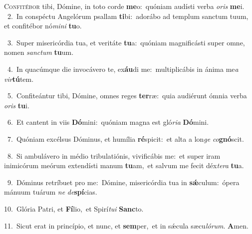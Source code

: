 \lettrine{\initial\textcolor{\initialcolor}{C}}{onfitébor} tibi, Dómine, in toto corde \textbf{me}\-o:~\star quóniam audísti verba \textit{o}\-\textit{ris} \textbf{me}\-i.\\
{\numbfont\textcolor{\numbcolor}{~2.}}~In conspéctu Angelórum psallam \textbf{ti}\-bi:~\star adorábo ad templum sanctum tuum, et confitébor nó\-\textit{mi}\-\textit{ni} \textbf{tu}\-o.\par
{\numbfont\textcolor{\numbcolor}{~3.}}~Super misericórdia tua, et veritáte \textbf{tu}\-a:~\star quóniam magnificásti super omne, nomen \textit{sanc}\-\textit{tum} \textbf{tu}\-um.\par
{\numbfont\textcolor{\numbcolor}{~4.}}~In quacúmque die invocávero te, ex\-\textbf{áu}\-di me:~\star multiplicábis in ánima me\textit{a} \textit{vir}\-\textbf{tú}tem.\par
{\numbfont\textcolor{\numbcolor}{~5.}}~Confiteántur tibi, Dómine, omnes reges \textbf{ter}\-ræ:~\star quia audiérunt ómnia verba \textit{o}\-\textit{ris} \textbf{tu}\-i.\par
{\numbfont\textcolor{\numbcolor}{~6.}}~Et cantent in viis \textbf{Dó}\-mini:~\star quóniam magna est gló\-\textit{ri}\-\textit{a} \textbf{Dó}\-mini.\par
{\numbfont\textcolor{\numbcolor}{~7.}}~Quóniam excélsus Dóminus, et humília \textbf{ré}\-spicit:~\star et alta a lon\textit{ge} \textit{co}\-\textbf{gnó}scit.\par
{\numbfont\textcolor{\numbcolor}{~8.}}~Si ambulávero in médio tribulatiónis, vivificábis me:~\dagger et super iram inimicórum meórum extendísti manum \textbf{tu}\-am,~\star et salvum me fecit déx\-\textit{te}\-\textit{ra} \textbf{tu}\-a.\par
{\numbfont\textcolor{\numbcolor}{~9.}}~Dóminus retríbuet pro me:~\dagger Dómine, misericórdia tua in \textbf{sǽ}\-culum:~\star ópera mánuum tuárum \textit{ne} \textit{de}\-\textbf{spí}cias.\par
{\numbfont\textcolor{\numbcolor}{10.}}~Glória Patri, et \textbf{Fí}\-lio,~\star et Spirí\-\textit{tu}\-\textit{i} \textbf{Sanc}\-to.\par
{\numbfont\textcolor{\numbcolor}{11.}}~Sicut erat in princípio, et nunc, et \textbf{sem}\-per,~\star et in sǽcula sæcu\-\textit{ló}\-\textit{rum}. \textbf{A}\-men.\par

